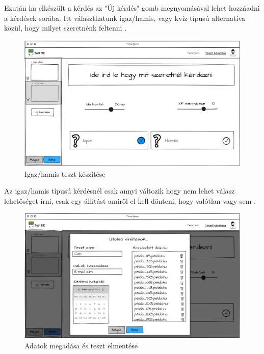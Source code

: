 Ezután ha elkészült a kérdés az "Új kérdés" gomb megnyomásával lehet hozzáadni a kérdések sorába. Itt választhatunk igaz/hamis, vagy kvíz típusú alternatíva közül, hogy milyet szeretnénk feltenni .

\begin{figure}[H]
    \centering
    \includegraphics[width=\linewidth]{images/make_test3_wireframe.png}
    \caption{Igaz/hamis teszt készítése}
    \label{fig:test_true_false}
\end{figure}

Az igaz/hamis típusú kérdésnél csak annyi változik hogy nem lehet válasz lehetőséget írni, csak egy állítást amiről el kell dönteni, hogy valótlan vagy sem .

\begin{figure}[H]
    \centering
    \includegraphics[width=\linewidth]{images/make_test4_wireframe.png}
    \caption{Adatok megadása és teszt elmentése}
    \label{fig:save_test}
\end{figure}

